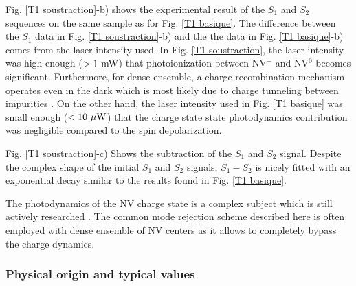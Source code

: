 \documentclass[a4paper,11pt]{report}
\begin{document}
Fig. \ref{T1 soustraction}-b) shows the experimental result of the $S_1$ and $S_2$ sequences on the same sample as for Fig. \ref{T1 basique}. The difference between the $S_1$ data in Fig. \ref{T1 soustraction}-b) and the the data in Fig. \ref{T1 basique}-b) comes from the laser intensity used. In Fig. \ref{T1 soustraction}, the laser intensity was high enough ($> 1\ \rm{mW}$) that photoionization between NV$^-$ and NV$^0$ becomes significant. Furthermore, for dense ensemble, a charge recombination mechanism operates even in the dark which is most likely due to charge tunneling between impurities \citep{choi2017depolarization, giri2018coupled, giri2019selective}. On the other hand, the laser intensity used in Fig. \ref{T1 basique} was small enough ($< 10\ \mu \rm{W}$) that the charge state state photodynamics contribution was negligible compared to the spin depolarization.

Fig. \ref{T1 soustraction}-c) Shows the subtraction of the $S_1$ and $S_2$ signal. Despite the complex shape of the initial $S_1$ and $S_2$ signals, $S_1-S_2$ is nicely fitted with an exponential decay similar to the results found in Fig. \ref{T1 basique}.

The photodynamics of the NV charge state is a complex subject which is still actively researched \citep{craik2020microwave, gorrini2021long}. The common mode rejection scheme described  here is often employed with dense ensemble of NV centers \citep{jarmola2012temperature, mrozek2015longitudinal, choi2017depolarization} as it allows to completely bypass the charge dynamics.

\subsubsection{Physical origin and typical values}
\end{document}
